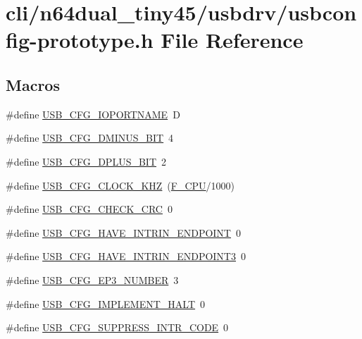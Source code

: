 \hypertarget{usbconfig-prototype_8h}{\section{cli/n64dual\-\_\-tiny45/usbdrv/usbconfig-\/prototype.h File Reference}
\label{usbconfig-prototype_8h}
}
\subsection*{Macros}
\begin{DoxyCompactItemize}
\item 
\#define \hyperlink{usbconfig-prototype_8h_a98ed17962b55543b35e10ae1f8ebe09b}{U\-S\-B\-\_\-\-C\-F\-G\-\_\-\-I\-O\-P\-O\-R\-T\-N\-A\-M\-E}~D
\item 
\#define \hyperlink{usbconfig-prototype_8h_a3a8bf6679cd70d1ddcc05024ffef9922}{U\-S\-B\-\_\-\-C\-F\-G\-\_\-\-D\-M\-I\-N\-U\-S\-\_\-\-B\-I\-T}~4
\item 
\#define \hyperlink{usbconfig-prototype_8h_a3005cdbb03c707af8007363632d7d02d}{U\-S\-B\-\_\-\-C\-F\-G\-\_\-\-D\-P\-L\-U\-S\-\_\-\-B\-I\-T}~2
\item 
\#define \hyperlink{usbconfig-prototype_8h_a9bf12dabd0e5186299ed0f13cd00dfeb}{U\-S\-B\-\_\-\-C\-F\-G\-\_\-\-C\-L\-O\-C\-K\-\_\-\-K\-H\-Z}~(\hyperlink{features_8h_a43bafb28b29491ec7f871319b5a3b2f8}{F\-\_\-\-C\-P\-U}/1000)
\item 
\#define \hyperlink{usbconfig-prototype_8h_a57122aa75d9b598adcd238aee5f2b4b7}{U\-S\-B\-\_\-\-C\-F\-G\-\_\-\-C\-H\-E\-C\-K\-\_\-\-C\-R\-C}~0
\item 
\#define \hyperlink{usbconfig-prototype_8h_afe176bba6f05a034a5eec11f7ed6302b}{U\-S\-B\-\_\-\-C\-F\-G\-\_\-\-H\-A\-V\-E\-\_\-\-I\-N\-T\-R\-I\-N\-\_\-\-E\-N\-D\-P\-O\-I\-N\-T}~0
\item 
\#define \hyperlink{usbconfig-prototype_8h_a973c0b60531876ba52c4447e0fd0a150}{U\-S\-B\-\_\-\-C\-F\-G\-\_\-\-H\-A\-V\-E\-\_\-\-I\-N\-T\-R\-I\-N\-\_\-\-E\-N\-D\-P\-O\-I\-N\-T3}~0
\item 
\#define \hyperlink{usbconfig-prototype_8h_a6ba1def233ee0e102febe80e53af53a7}{U\-S\-B\-\_\-\-C\-F\-G\-\_\-\-E\-P3\-\_\-\-N\-U\-M\-B\-E\-R}~3
\item 
\#define \hyperlink{usbconfig-prototype_8h_af2a9b3ecff1707f1b6554a881a87b954}{U\-S\-B\-\_\-\-C\-F\-G\-\_\-\-I\-M\-P\-L\-E\-M\-E\-N\-T\-\_\-\-H\-A\-L\-T}~0
\item 
\#define \hyperlink{usbconfig-prototype_8h_a51ab4fa0f312f536ec6d4bc99a75c1b6}{U\-S\-B\-\_\-\-C\-F\-G\-\_\-\-S\-U\-P\-P\-R\-E\-S\-S\-\_\-\-I\-N\-T\-R\-\_\-\-C\-O\-D\-E}~0

\end{DoxyCompactItemize}
